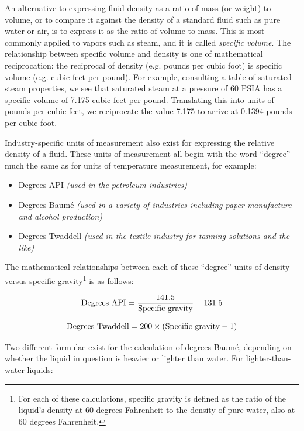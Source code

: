 \vskip 10pt

An alternative to expressing fluid density as a ratio of mass (or weight) to volume, or to compare it against the density of a standard fluid such as pure water or air, is to express it as the ratio of volume to mass.  This is most commonly applied to vapors such as steam, and it is called \textit{specific volume}.  The relationship between specific volume and density is one of mathematical reciprocation: the reciprocal of density (e.g. pounds per cubic foot) is specific volume (e.g. cubic feet per pound).  For example, consulting a table of saturated steam properties, we see that saturated steam at a pressure of 60 PSIA has a specific volume of 7.175 cubic feet per pound.  Translating this into units of pounds per cubic feet, we reciprocate the value 7.175 to arrive at 0.1394 pounds per cubic foot.   

\vskip 10pt

Industry-specific units of measurement also exist for expressing the relative density of a fluid.  These units of measurement all begin with the word ``degree'' much the same as for units of temperature measurement, for example:        

\begin{itemize}
\item Degrees API \textit{(used in the petroleum industries)}
\item Degrees Baum\'e \textit{(used in a variety of industries including paper manufacture and alcohol production)}
\item Degrees Twaddell \textit{(used in the textile industry for tanning solutions and the like)}
\end{itemize}

\filbreak

The mathematical relationships between each of these ``degree'' units of density versus specific gravity\footnote{For each of these calculations, specific gravity is defined as the ratio of the liquid's density at 60 degrees Fahrenheit to the density of pure water, also at 60 degrees Fahrenheit.} is as follows:

$$\hbox{Degrees API} = {141.5 \over \hbox{Specific gravity}} - 131.5$$

$$\hbox{Degrees Twaddell} = 200 \times (\hbox{Specific gravity} - 1)$$

Two different formulae exist for the calculation of degrees Baum\'e, depending on whether the liquid in question is heavier or lighter than water.  For lighter-than-water liquids:

